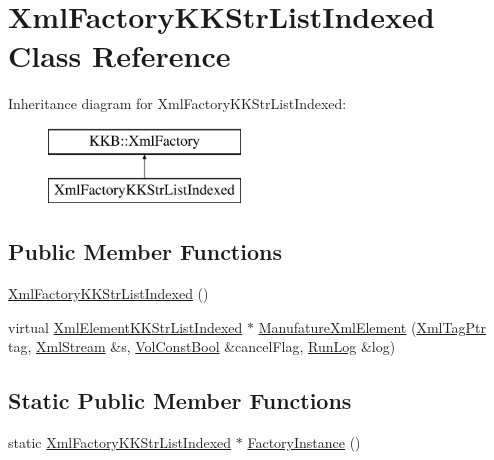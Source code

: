 \hypertarget{class_xml_factory_k_k_str_list_indexed}{}\section{Xml\+Factory\+K\+K\+Str\+List\+Indexed Class Reference}
\label{class_xml_factory_k_k_str_list_indexed}
Inheritance diagram for Xml\+Factory\+K\+K\+Str\+List\+Indexed\+:\begin{figure}[H]
\begin{center}
\leavevmode
\includegraphics[height=2.000000cm]{class_xml_factory_k_k_str_list_indexed}
\end{center}
\end{figure}
\subsection*{Public Member Functions}
\begin{DoxyCompactItemize}
\item 
\hyperlink{class_xml_factory_k_k_str_list_indexed_a0b7ef814f89c07d757c364f7aafe4c58}{Xml\+Factory\+K\+K\+Str\+List\+Indexed} ()
\item 
virtual \hyperlink{namespace_k_k_b_ae29919a9a9a3ffa88c3b4757aba6b15e}{Xml\+Element\+K\+K\+Str\+List\+Indexed} $\ast$ \hyperlink{class_xml_factory_k_k_str_list_indexed_a128768ad55a306f6c145464149d35118}{Manufature\+Xml\+Element} (\hyperlink{namespace_k_k_b_a9253a3ea8a5da18ca82be4ca2b390ef0}{Xml\+Tag\+Ptr} tag, \hyperlink{class_k_k_b_1_1_xml_stream}{Xml\+Stream} \&s, \hyperlink{namespace_k_k_b_a7d390f568e2831fb76b86b56c87bf92f}{Vol\+Const\+Bool} \&cancel\+Flag, \hyperlink{class_k_k_b_1_1_run_log}{Run\+Log} \&log)
\end{DoxyCompactItemize}
\subsection*{Static Public Member Functions}
\begin{DoxyCompactItemize}
\item 
static \hyperlink{class_xml_factory_k_k_str_list_indexed}{Xml\+Factory\+K\+K\+Str\+List\+Indexed} $\ast$ \hyperlink{class_xml_factory_k_k_str_list_indexed_abfeb47dd0f8c6a8e1c0bfaf5ac3004c3}{Factory\+Instance} ()
\end{DoxyCompactItemize}

